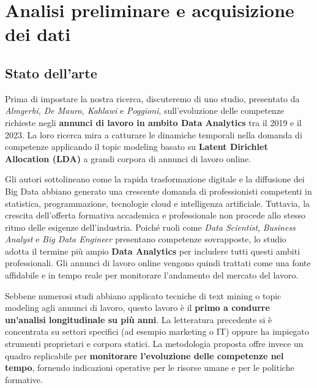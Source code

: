 \chapter{Analisi preliminare e acquisizione dei dati}
\section{Stato dell'arte}
Prima di impostare la nostra ricerca, discuteremo di uno studio, presentato da \textit{Almgerbi, De Mauro, Kahlawi} e \textit{Poggioni}, sull'evoluzione delle competenze richieste negli \textbf{annunci di lavoro in ambito Data Analytics} tra il 2019 e il 2023.
La loro ricerca mira a catturare le dinamiche temporali nella domanda di competenze applicando il topic modeling basato su \textbf{Latent Dirichlet Allocation (LDA)} a grandi corpora di annunci di lavoro online.

Gli autori sottolineano come la rapida trasformazione digitale e la diffusione dei Big Data abbiano generato una crescente domanda di professionisti competenti in statistica, programmazione, tecnologie cloud e intelligenza artificiale.
Tuttavia, la crescita dell'offerta formativa accademica e professionale non procede allo stesso ritmo delle esigenze dell'industria.
Poiché ruoli come \textit{Data Scientist}, \textit{Business Analyst} e \textit{Big Data Engineer} presentano competenze sovrapposte, lo studio adotta il termine più ampio \textbf{Data Analytics} per includere tutti questi ambiti professionali.
Gli annunci di lavoro online vengono quindi trattati come una fonte affidabile e in tempo reale per monitorare l'andamento del mercato del lavoro.

Sebbene numerosi studi abbiano applicato tecniche di text mining o topic modeling agli annunci di lavoro, questo lavoro è il \textbf{primo a condurre un'analisi longitudinale su più anni}.
La letteratura precedente si è concentrata su settori specifici (ad esempio marketing o IT) oppure ha impiegato strumenti proprietari e corpora statici.
La metodologia proposta offre invece un quadro replicabile per \textbf{monitorare l'evoluzione delle competenze nel tempo}, fornendo indicazioni operative per le risorse umane e per le politiche formative.

